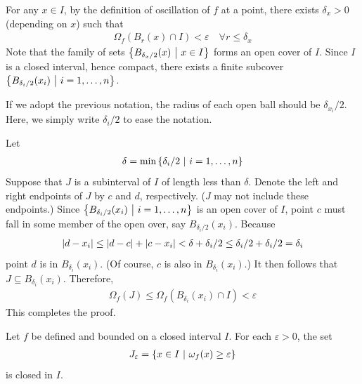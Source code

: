 \documentclass[thmcnt=section, 12pt]{my-elegantbook}
\begin{document}
\begin{solution}
    For any $x \in I$,
    by the definition of oscillation of $f$ at a point,
    there exists $\delta_x > 0$ (depending on $x$) such that
    \begin{align*}
        \Omega_f( B_r(x) \cap I ) < \varepsilon
        \quad \forall r \leq \delta_x
    \end{align*}
    Note that the family of sets $\left\{ B_{\delta_x / 2} (x) \ \middle| \ x \in I \right\}$
    forms an open cover of $I$.
    Since $I$ is a closed interval, hence compact,
    there exists a finite
    subcover $\left\{ B_{\delta_i / 2}(x_i) \ \middle| \ i = 1, \ldots, n \right\}$.
    \begin{note}
        If we adopt the previous notation,
        the radius of each open ball should be $\delta_{x_i} / 2$.
        Here, we simply write $\delta_i / 2$ to ease the notation.
    \end{note}

    Let
    \begin{align*}
        \delta = \min \left\{ \delta_i / 2 \ \middle| \ i = 1, \ldots, n \right\}
    \end{align*}
    Suppose that $J$ is a subinterval of $I$
    of length less than $\delta$.
    Denote the left and right endpoints of $J$ by $c$ and $d$,
    respectively. ($J$ may not include these endpoints.)
    Since $\left\{ B_{\delta_i / 2}(x_i) \ \middle| \ i=1, \ldots, n \right\}$
    is an open cover of $I$,
    point $c$ must fall in some member of the open over,
    say $B_{\delta_i / 2}(x_i)$.
    Because
    \begin{align*}
        \left\lvert d - x_i \right\rvert
        \leq \left\lvert d - c \right\rvert + \left\lvert c - x_i \right\rvert
        < \delta + \delta_i / 2
        \leq \delta_i / 2 + \delta_i / 2
        = \delta_i
    \end{align*}
    point $d$ is in $B_{\delta_i}(x_i)$.
    (Of course, $c$ is also in $B_{\delta_i}(x_i)$.)
    It then follows that $J \subseteq B_{\delta_i}(x_i)$.
    Therefore,
    \begin{align*}
        \Omega_f(J) \leq \Omega_f(B_{\delta_i}(x_i) \cap I)
        < \varepsilon
    \end{align*}
    This completes the proof.
\end{solution}


\begin{lemma} \label{lem:7}
    Let $f$ be defined and bounded on a closed interval $I$.
    For each $\varepsilon > 0$, the set
    \begin{align*}
        J_\varepsilon = \left\{ x \in I \ \middle| \ \omega_f(x) \geq \varepsilon \right\}
    \end{align*}
    is closed in $I$.
\end{lemma}
\end{document}
